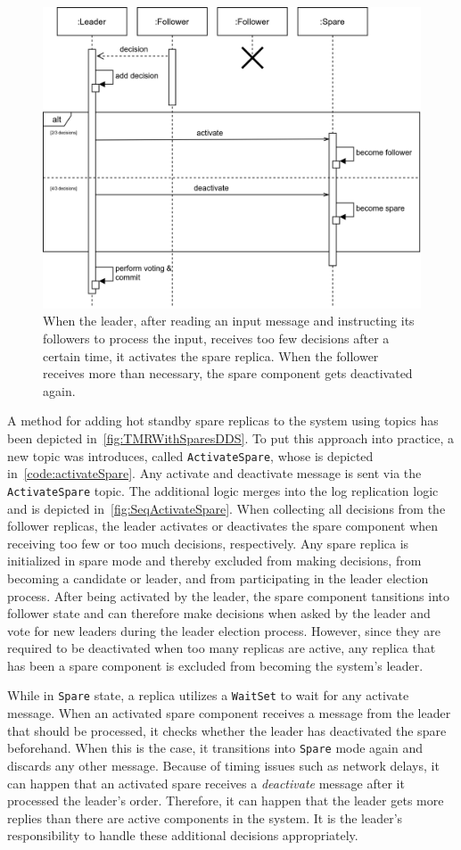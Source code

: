 \begin{figure}[!hb]
	\centering
	\includegraphics[width=0.75\linewidth]{images/sequence/ActivateSpare}
	\caption{When the leader, after reading an input message and instructing its followers to process the input, receives too few decisions after a certain time, it activates the spare replica. When the follower receives more than necessary, the spare component gets deactivated again.}
	\label{fig:SeqActivateSpare}
\end{figure}

A method for adding hot standby spare replicas to the system using  topics has been depicted in~\autoref{fig:TMRWithSparesDDS}.
To put this approach into practice, a new topic was introduces, called \texttt{ActivateSpare}, whose  is depicted in~\autoref{code:activateSpare}.
Any activate and deactivate message is sent via the \texttt{ActivateSpare} topic.
The additional logic merges into the log replication logic and is depicted in~\autoref{fig:SeqActivateSpare}.
When collecting all decisions from the follower replicas, the leader activates or deactivates the spare component when receiving too few or too much decisions, respectively.
Any spare replica is initialized in spare mode and thereby excluded from making decisions, from becoming a candidate or leader, and from participating in the leader election process.
After being activated by the leader, the spare component tansitions into follower state and can therefore make decisions when asked by the leader and vote for new leaders during the leader election process.
However, since they are required to be deactivated when too many replicas are active, any replica that has been a spare component is excluded from becoming the system's leader.

While in \texttt{Spare} state, a replica utilizes a \texttt{WaitSet} to wait for any activate message.
When an activated spare component receives a message from the leader that should be processed, it checks whether the leader has deactivated the spare beforehand.
When this is the case, it transitions into \texttt{Spare} mode again and discards any other message.
Because of timing issues such as network delays, it can happen that an activated spare receives a \textit{deactivate} message after it processed the leader's order.
Therefore, it can happen that the leader gets more replies than there are active components in the system.
It is the leader's responsibility to handle these additional decisions appropriately.
\\


